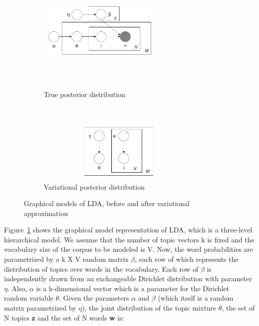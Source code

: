 \documentclass{article} %
\begin{document}
\begin{figure}[h]
	\centering
	\begin{subfigure}[b]{0.45\textwidth}
	\includegraphics[width=6cm,height=6cm,keepaspectratio]{lda-model.png}
	\caption{True posterior distribution}
	\label{fig:lda-model}
	\end{subfigure}
	~
	\begin{subfigure}[b]{0.5\textwidth}
	\includegraphics[width=8cm,height=3cm,keepaspectratio]{lda-variational.png}
	\caption{Variational posterior distribution}
	\label{fig:lda-variational}
	\end{subfigure}
\caption{Graphical models of LDA, before and after variational approximation}
\label{fig:models}
\end{figure}


Figure~\ref{fig:lda-model} shows the graphical model representation of LDA, which is
a three-level hierarchical model. We
assume that the number of topic vectors k is fixed and the vocabulary size of
the corpus to be modeled is V. Now, the word probabilities are parametrized
by a k X V random matrix $\beta$, each row of which represents the distribution 
of topics over words in the vocabulary. Each row of $\beta$ is independently 
drawn from an exchangeable Dirichlet distribution with parameter $\eta$.
Also, $\alpha$ is a k-dimensional vector 
which is a parameter for the Dirichlet random variable $\theta$. Given the
parameters $\alpha$ and $\beta$ (which itself is a random matrix parametrized
by $\eta$), the joint distribution of the topic mixture
$\theta$, the set of N topics {\bf z} and the set of N words {\bf w} is:
\end{document}

